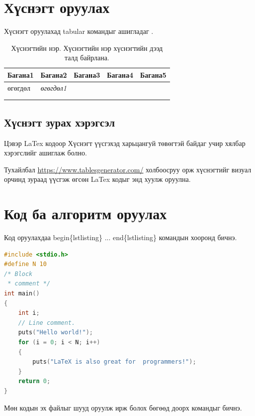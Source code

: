 \chapter{Хүснэгт оруулах}
Хүснэгт оруулахад tabular командыг ашигладаг \cite{table}.

\begin{table}[h]
	\centering
	\caption{Хүснэгтийн нэр. Хүснэгтийн нэр хүснэгтийн дээд талд байрлана. }
	\label{my-label}
	\begin{tabular}{|l|l|l|l|l|}
		\hline
		\textbf{Багана1} & \textbf{Багана2}  & \textbf{Багана3} & \textbf{Багана4} & \textbf{Багана5} \\ \hline
		өгөгдөл          & \textit{өгөгдөл1} &                  &                  &                  \\ \hline
		                 &                   &                  &                  &                  \\ \hline
		                 &                   &                  &                  &                  \\ \hline
	\end{tabular}
\end{table}

\section{Хүснэгт зурах хэрэгсэл}
Цэвэр LaTex кодоор Хүснэгт үүсгэхэд харьцангуй төвөгтэй байдаг учир
хялбар хэрэгслийг ашиглаж болно.

Тухайлбал \url{https://www.tablesgenerator.com/} холбоосруу орж хүснэгтийг визуал орчинд зураад үүсгэж өгсөн LaTex кодыг энд хуулж оруулна.

\chapter{Код ба алгоритм оруулах}
Код оруулахдаа begin\{lstlisting\}  ... end\{lstlisting\} командын хооронд бичнэ.

\begin{lstlisting}[language=C, caption=С хэлний кодын жишээ, frame=single]
#include <stdio.h>
#define N 10
/* Block
 * comment */
int main()
{
    int i;
    // Line comment.
    puts("Hello world!");
    for (i = 0; i < N; i++)
    {
        puts("LaTeX is also great for  programmers!");
    }
    return 0;
}
\end{lstlisting}

Мөн кодын эх файлыг шууд оруулж ирж болох бөгөөд доорх командыг бичнэ.

